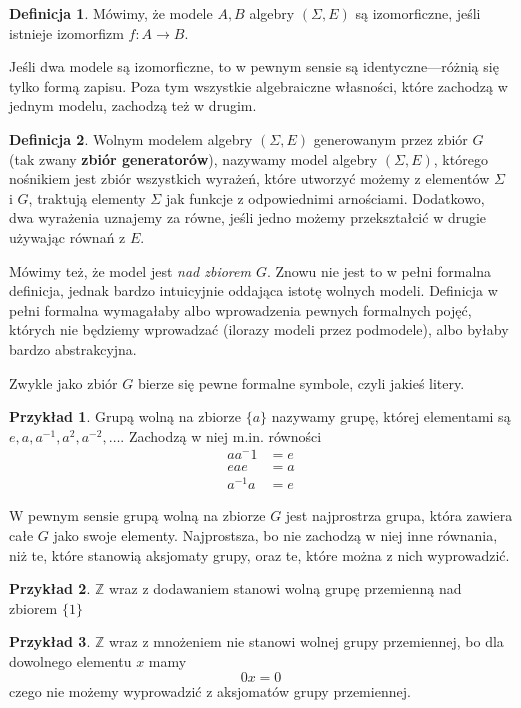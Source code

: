 \documentclass{article}
\theoremstyle{definition}
\newtheorem{definition}{Definicja}[section]
\newtheorem{example}{Przykład}[section]
\begin{document}
\begin{definition}
	Mówimy, że modele $A, B$ algebry $(\Sigma, E)$ są izomorficzne,
		jeśli istnieje izomorfizm $f: A \to B$.
\end{definition}
Jeśli dwa modele są izomorficzne, to w pewnym sensie są identyczne---różnią się tylko formą zapisu.
Poza tym wszystkie algebraiczne własności,
	które zachodzą w jednym modelu,
	zachodzą też w drugim.

\begin{definition}
    Wolnym modelem algebry $(\Sigma, E)$ generowanym przez zbiór $G$ (tak zwany \textbf{zbiór generatorów}),
    nazywamy model algebry $(\Sigma, E)$, którego nośnikiem jest zbiór wszystkich wyrażeń,
		które utworzyć możemy z elementów $\Sigma$ i $G$, traktują elementy $\Sigma$ jak
		funkcje z odpowiednimi arnościami.
	Dodatkowo,
		dwa wyrażenia uznajemy za równe,
		jeśli jedno możemy przekształcić w drugie używając równań z $E$.
\end{definition}
Mówimy też, że model jest \textit{nad zbiorem $G$}.
Znowu nie jest to w pełni formalna definicja,
	jednak bardzo intuicyjnie oddająca istotę wolnych modeli.
Definicja w pełni formalna wymagałaby albo wprowadzenia pewnych formalnych pojęć,
	których nie będziemy wprowadzać (ilorazy modeli przez podmodele),
	albo byłaby bardzo abstrakcyjna.

Zwykle jako zbiór $G$ bierze się pewne formalne symbole, czyli jakieś litery.

\begin{example}
	Grupą wolną na zbiorze $\{a\}$ nazywamy grupę, której elementami są
	$e, a, a^{-1}, a^2, a^{-2}, \dots$.
	Zachodzą w niej m.in. równości
	\begin{align}
		aa{^-1} &= e \\
		eae &= a \\
		a^{-1}a &= e
	\end{align}
\end{example}

W pewnym sensie grupą wolną na zbiorze $G$ jest najprostrza grupa,
	która zawiera całe $G$ jako swoje elementy.
Najprostsza,
	bo nie zachodzą w niej inne równania,
	niż te,
	które stanowią aksjomaty grupy,
	oraz te,
	które można z nich wyprowadzić.

\begin{example}
	$\mathbb{Z}$ wraz z dodawaniem stanowi wolną grupę przemienną nad zbiorem $\{1\}$
\end{example}

\begin{example}
	$\mathbb{Z}$ wraz z mnożeniem nie stanowi wolnej grupy przemiennej,
		bo dla dowolnego elementu $x$ mamy
		\begin{equation}
		0x = 0
		\end{equation}
		czego nie możemy wyprowadzić z aksjomatów grupy przemiennej.
\end{example}
\end{document}
